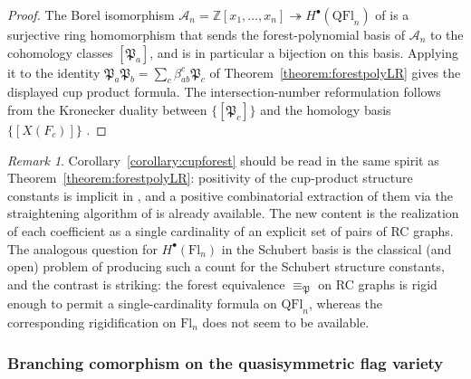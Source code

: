 \documentclass[a4paper,fleqn]{cas-sc}
\theoremstyle{definition}
\theoremstyle{remark}
\newtheorem*{remark}{Remark}
\numberwithin{equation}{subsection}
\newcommand{\coma}{\mathcal{A}}
\newcommand{\forest}{\mathfrak{P}}
\begin{document}
\begin{proof}
The Borel isomorphism $\coma_n=\mathbb{Z}[x_1,\ldots,x_n]\twoheadrightarrow H^\bullet(\mathrm{QFl}_n)$ of \cite[Theorem~A and Corollary~12.5]{bergeron2025qsymflag} is a surjective ring homomorphism that sends the forest-polynomial basis of $\coma_n$ to the cohomology classes $[\forest_a]$, and is in particular a bijection on this basis. Applying it to the identity $\forest_a\forest_b = \sum_c \beta_{ab}^c \forest_c$ of Theorem~\ref{theorem:forestpolyLR} gives the displayed cup product formula. The intersection-number reformulation follows from the Kronecker duality between $\{[\forest_c]\}$ and the homology basis $\{[X(F_c)]\}$ \cite[Theorem~12.12]{bergeron2025qsymflag}.
\end{proof}

\begin{remark}
Corollary~\ref{corollary:cupforest} should be read in the same spirit as Theorem~\ref{theorem:forestpolyLR}: positivity of the cup-product structure constants is implicit in \cite{bergeron2025equivariant,bergeron2025qsymflag}, and a positive combinatorial extraction of them via the straightening algorithm of \cite{bergeron2025equivariant} is already available. The new content is the realization of each coefficient as a single cardinality of an explicit set of pairs of RC graphs. The analogous question for $H^\bullet(\mathrm{Fl}_n)$ in the Schubert basis is the classical (and open) problem of producing such a count for the Schubert structure constants, and the contrast is striking: the forest equivalence $\equiv_\forest$ on RC graphs is rigid enough to permit a single-cardinality formula on $\mathrm{QFl}_n$, whereas the corresponding rigidification on $\mathrm{Fl}_n$ does not seem to be available.
\end{remark}

\subsubsection*{Branching comorphism on the quasisymmetric flag variety}
\end{document}

